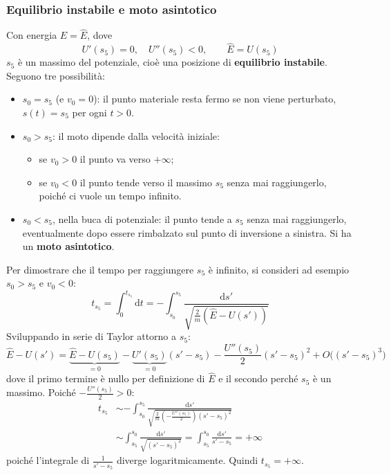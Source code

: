\documentclass[11pt, a4paper, openright]{book}
\theoremstyle{plain}
\theoremstyle{definition}
\theoremstyle{remark}
\begin{document}
\subsubsection{Equilibrio instabile e moto asintotico}
    Con energia $E = \hat{E}$, dove
    \begin{equation}
        U'(s_5) = 0, \quad U''(s_5) < 0, \qquad \hat{E} = U(s_5)
    \end{equation}
    $s_5$ è un massimo del potenziale, cioè una posizione di \textbf{equilibrio instabile}. Seguono tre possibilità:
    \begin{itemize}
        \item $s_0 = s_5$ (e $v_0 = 0$): il punto materiale resta fermo se non viene perturbato, $s(t) = s_5$ per ogni $t > 0$.
        \item $s_0 > s_5$: il moto dipende dalla velocità iniziale:
        \begin{itemize}
            \item se $v_0 > 0$ il punto va verso $+\infty$;
            \item se $v_0 < 0$ il punto tende verso il massimo $s_5$ senza mai raggiungerlo, poiché ci vuole un tempo infinito.
        \end{itemize}
        \item $s_0 < s_5$, nella buca di potenziale: il punto tende a $s_5$ senza mai raggiungerlo, eventualmente dopo essere rimbalzato sul punto di inversione a sinistra. Si ha un \textbf{moto asintotico}.
    \end{itemize}

    Per dimostrare che il tempo per raggiungere $s_5$ è infinito, si consideri ad esempio $s_0 > s_5$ e $v_0 < 0$:
    \begin{equation}
        t_{s_5} = \int_{0}^{t_{s_5}} \mathrm{d}t = -\int_{s_0}^{s_5} \frac{\mathrm{d}s'}{\sqrt{\frac{2}{m}(\hat{E} - U(s'))}}
    \end{equation}
    Sviluppando in serie di Taylor attorno a $s_5$:
    \begin{equation}
        \hat{E} - U(s') = \underbrace{\hat{E} - U(s_5)}_{= 0} - \underbrace{U'(s_5)}_{= 0}(s' - s_5) - \frac{U''(s_5)}{2}(s' - s_5)^2 + O\big((s' - s_5)^3\big)
    \end{equation}
    dove il primo termine è nullo per definizione di $\hat{E}$ e il secondo perché $s_5$ è un massimo. Poiché $-\frac{U''(s_5)}{2} > 0$:
    \begin{align}
        t_{s_5} &\sim -\int_{s_0}^{s_5} \frac{\mathrm{d}s'}{\sqrt{\frac{2}{m}\left(-\frac{U''(s_5)}{2}\right)(s' - s_5)^2}} \\
        &\sim \int_{s_5}^{s_0} \frac{\mathrm{d}s'}{\sqrt{(s' - s_5)^2}} = \int_{s_5}^{s_0} \frac{\mathrm{d}s'}{s' - s_5} = +\infty
    \end{align}
    poiché l'integrale di $\frac{1}{s' - s_5}$ diverge logaritmicamente. Quindi $t_{s_5} = +\infty$.
\end{document}
